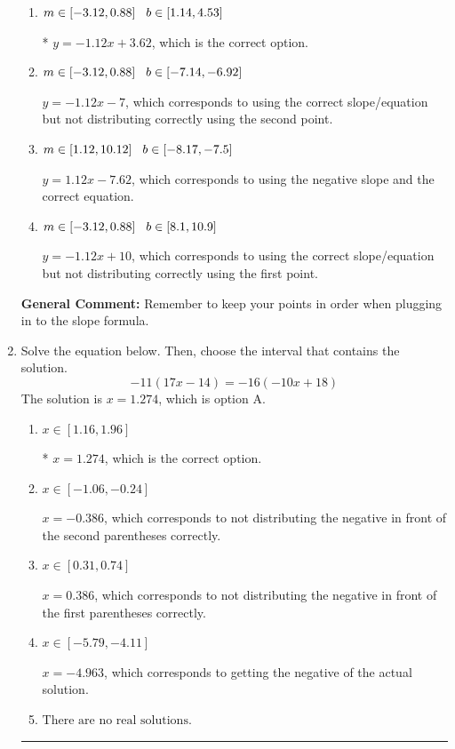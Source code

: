 \documentclass{extbook}[14pt]
\newcommand{\litem}[1]{\item #1

\rule{\textwidth}{0.4pt}}
\begin{document}
\begin{enumerate}
{\begin{enumerate}[label=\Alph*.]
 $y = -1.12x -3.62$, which corresponds to using the correct slope and getting the negative y-intercept.
\item \( m \in [-3.12, 0.88] \hspace*{3mm} b \in [1.14, 4.53] \)

* $y = -1.12x + 3.62$, which is the correct option.
\item \( m \in [-3.12, 0.88] \hspace*{3mm} b \in [-7.14, -6.92] \)

 $y = -1.12x -7$, which corresponds to using the correct slope/equation but not distributing correctly using the second point.
\item \( m \in [1.12, 10.12] \hspace*{3mm} b \in [-8.17, -7.5] \)

 $y = 1.12x -7.62$, which corresponds to using the negative slope and the correct equation.
\item \( m \in [-3.12, 0.88] \hspace*{3mm} b \in [8.1, 10.9] \)

 $y = -1.12x + 10$, which corresponds to using the correct slope/equation but not distributing correctly using the first point.
\end{enumerate}

\textbf{General Comment:} Remember to keep your points in order when plugging in to the slope formula.
}
\litem{
Solve the equation below. Then, choose the interval that contains the solution.
\[ -11(17x -14) = -16(-10x + 18) \]The solution is \( x = 1.274 \), which is option A.\begin{enumerate}[label=\Alph*.]
\item \( x \in [1.16, 1.96] \)

* $x = 1.274$, which is the correct option.
\item \( x \in [-1.06, -0.24] \)

$x = -0.386$, which corresponds to not distributing the negative in front of the second parentheses correctly.
\item \( x \in [0.31, 0.74] \)

$x = 0.386$, which corresponds to not distributing the negative in front of the first parentheses correctly.
\item \( x \in [-5.79, -4.11] \)

$x = -4.963$, which corresponds to getting the negative of the actual solution.
\item \( \text{There are no real solutions.} \)


\end{enumerate}}
\end{enumerate}
\end{document}
